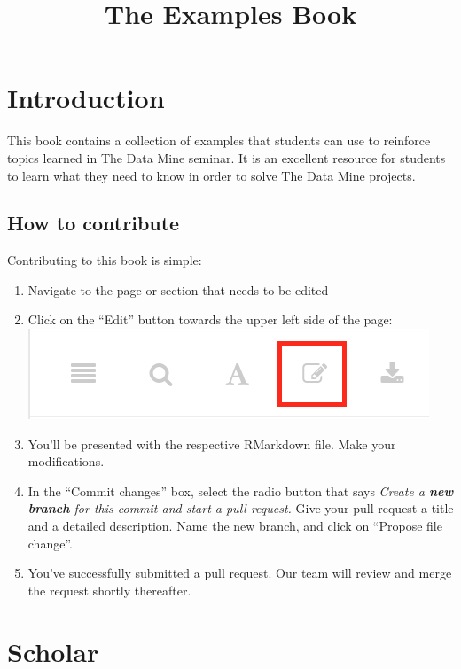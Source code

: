 \documentclass[
]{book}
\title{The Examples Book}
\author{}
\date{\vspace{-2.5em}}
\begin{document}
\maketitle

{
\setcounter{tocdepth}{1}
\tableofcontents
}
\hypertarget{introduction}{%
\chapter{Introduction}\label{introduction}}

This book contains a collection of examples that students can use to reinforce topics learned in The Data Mine seminar. It is an excellent resource for students to learn what they need to know in order to solve The Data Mine projects.

\hypertarget{how-to-contribute}{%
\section{How to contribute}\label{how-to-contribute}}

Contributing to this book is simple:

\begin{enumerate}
\def\labelenumi{\arabic{enumi}.}
\item
  Navigate to the page or section that needs to be edited
\item
  Click on the ``Edit'' button towards the upper left side of the page:
  \includegraphics{images/edit_button.png}
\item
  You'll be presented with the respective RMarkdown file. Make your modifications.
\item
  In the ``Commit changes'' box, select the radio button that says \emph{Create a \textbf{new branch} for this commit and start a pull request.} Give your pull request a title and a detailed description. Name the new branch, and click on ``Propose file change''.
\item
  You've successfully submitted a pull request. Our team will review and merge the request shortly thereafter.
\end{enumerate}

\hypertarget{scholar}{%
\chapter{Scholar}\label{scholar}}
\end{document}
